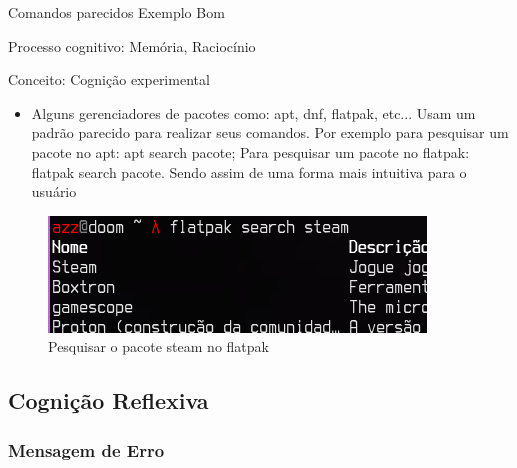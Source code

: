 \documentclass{beamer}
\begin{document}
\begin{frame}{Comandos parecidos Exemplo Bom}

Processo cognitivo: Memória, Raciocínio

Conceito: Cognição experimental

\begin{itemize}
    \item Alguns gerenciadores de pacotes como: apt, dnf, flatpak, etc... Usam um padrão parecido para realizar seus comandos. Por exemplo para pesquisar um pacote no apt: apt search pacote; Para pesquisar um pacote no flatpak: flatpak search pacote. Sendo assim de uma forma mais intuitiva para o usuário
\end{itemize}
\begin{figure}
    \centering
    \includegraphics[scale=0.8]{images/Flatpak-Good-Search.png}
    \caption{Pesquisar o pacote steam no flatpak}
\end{figure}

\end{frame}

\subsection{Cognição Reflexiva}
\subsubsection{Mensagem de Erro}
\end{document}
